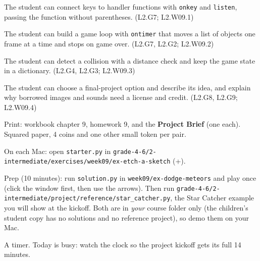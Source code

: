 
\begin{objectives}
  \item The student can connect keys to handler functions with \texttt{onkey} and \texttt{listen}, passing the function without parentheses. (L2.G7; L2.W09.1)
  \item The student can build a game loop with \texttt{ontimer} that moves a list of objects one frame at a time and stops on game over. (L2.G7, L2.G2; L2.W09.2)
  \item The student can detect a collision with a distance check and keep the game state in a dictionary. (L2.G4, L2.G3; L2.W09.3)
  \item The student can choose a final-project option and describe its idea, and explain why borrowed images and sounds need a license and credit. (L2.G8, L2.G9; L2.W09.4)
\end{objectives}

\begin{materials}
  \item Print: workbook chapter 9, homework 9, and the \textbf{Project Brief} (one each). Squared paper, 4 coins and one other small token per pair.
  \item On each Mac: open \texttt{starter.py} in \texttt{grade-4-6/2-intermediate/exercises/week09/ex-etch-a-sketch} (+).
  \item Prep (10 minutes): run \texttt{solution.py} in \texttt{week09/ex-dodge-meteors} and play once (click the window first, then use the arrows).
        Then run \texttt{grade-4-6/2-intermediate/project/reference/star\_catcher.py}, the Star Catcher example you will show at the kickoff.
        Both are in \emph{your} course folder only (the children's student copy has no solutions and no reference project), so demo them on your Mac.
  \item A timer. Today is busy: watch the clock so the project kickoff gets its full 14 minutes.
\end{materials}

